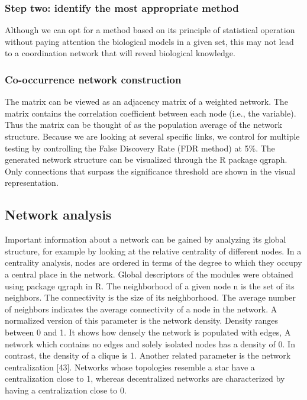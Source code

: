 \documentclass[a4paper]{article}
\begin{document}
\subsubsection{Step two: identify the most appropriate method} 

Although we can opt for a method based on its principle of statistical operation without paying attention the biological models in a given set, this may not lead to a coordination network that will reveal biological knowledge.

\subsubsection{Co-occurrence network construction}

The matrix can be viewed as an adjacency matrix of a weighted network. The matrix  contains the correlation coefficient  between each node (i.e., the variable). Thus the matrix  can be thought of as the population average of the network structure. Because we are looking at several specific links, we control for multiple testing by controlling the False Discovery Rate (FDR method) at 5\%. The generated network structure can be visualized through the R package qgraph. Only connections that surpass the significance threshold are shown in the visual representation.

\subsection{Network analysis}
Important information about a network can be gained by analyzing its global structure, for example by looking at the relative centrality of different nodes. In a centrality analysis, nodes are ordered in terms of the degree to which they occupy a central place in the network. Global descriptors of the modules were obtained using package qgraph in R. The neighborhood of a given node n is the set of its neighbors. The connectivity is the size of its neighborhood. The average number of neighbors indicates the average connectivity of a node in the network. A normalized version of this parameter is the network density. Density ranges between 0 and 1. It shows how densely the network is populated with edges, A network which contains no edges and solely isolated nodes has a density of 0. In contrast, the density of a clique is 1. Another related parameter is the network centralization [43]. Networks whose topologies resemble a star have a centralization close to 1, whereas decentralized networks are characterized by having a centralization close to 0.
\end{document}
